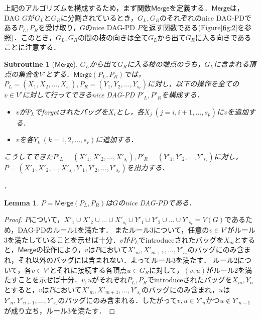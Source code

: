 \documentclass[master]{kuisthesis}		%
\theoremstyle{plain}
\newtheorem{subroutine}{Subroutine}
\newtheorem{lemma}{Lemma}
\theoremstyle{definition}
\begin{document}
上記のアルゴリズムを構成するため，まず関数$\mathsf{Merge}$を定義する．$\mathsf{Merge}$は，DAG $G$が$G_L$と$G_R$に分割されているとき，$G_L, G_R$のそれぞれのnice DAG-PDである$P_L, P_R$を受け取り，$G$のnice DAG-PD $P$を返す関数である(Figure\ref{fig:2}を参照)．このとき，$G_L, G_R$の間の枝の向きは全て$G_L$から出て$G_R$に入る向きであることに注意する．

\begin{subroutine}[$\mathsf{Merge}$]
    $G_L$から出て$G_R$に入る枝の端点のうち，$G_L$に含まれる頂点の集合を$V'$とする．$\mathsf{Merge}(P_L, P_R)$では，$P_L=(X_1, X_2, \dots , X_{s_l}), P_R=(Y_1, Y_2, \dots , Y_{s_r})$に対し，以下の操作を全ての$v \in V'$に対して行ってできるnice DAG-PD $P'_L, P'_R$を構成する．
    \begin{itemize}
      \item $v$が$P_L$でforgetされたバッグを$X_i$とし，各$X_j\ (j=i, i+1, \dots , s_p)$に$v$を追加する．
      \item $v$を各$Y_k\ (k=1, 2, \dots , s_r)$に追加する．
    \end{itemize}
    こうしてできた$P'_L=(X'_1, X'_2, \dots , X'_{s_l}), P'_R=(Y'_1, Y'_2, \dots , Y'_{s_r})$に対し，$P=(X'_1, X'_2, \dots , X'_{s_l}, Y'_1, Y'_2, \dots , Y'_{s_r})$を出力する．
\end{subroutine}．

\begin{lemma}
    $P=\mathsf{Merge}(P_L, P_R)$は$G$のnice DAG-PDである．
\end{lemma}

\begin{proof} 
$P$について，$X'_1 \cup X'_2 \cup \dots \cup X'_{s_l} \cup Y'_1 \cup Y'_2 \cup \dots \cup Y'_{s_r} = V(G)$であるため，DAG-PDのルール1を満たす．
またルール3について，任意の$v \in V'$がルール3を満たしていることを示せば十分．$v$が$P_L$でintroduceされたバッグを$X_m$とすると，$\mathsf{Merge}$の操作により，$v$は$P$において$X'_m, X'_{m+1}, \dots , Y'_{s_r}$のバッグにのみ含まれ，それ以外のバッグには含まれない．よってルール3を満たす．
ルール2について，各$v \in V'$とそれに接続する各頂点$u \in G_R$に対して，$(v, u)$がルール2を満たすことを示せば十分．$v, u$がそれぞれ$P_L, P_R$でintroduceされたバッグを$X_m, Y_n$とすると，$v$は$P$において$X'_m, X'_{m+1}, \dots , Y'_{s_r}$のバッグにのみ含まれ，$u$は$Y'_n, Y'_{n+1}, \dots , Y'_{s_r}$のバッグにのみ含まれる．したがって$v, u \in Y'_n$かつ$u \notin Y'_{n-1}$が成り立ち，ルール3を満たす．
\end{proof} 
\end{document}
